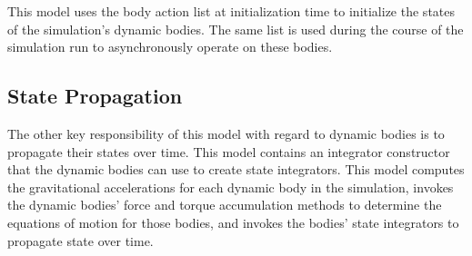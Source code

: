 This model uses the body action list
at initialization time to initialize the states of the simulation's
dynamic bodies. The same list is used during the course of the simulation
run to asynchronously operate on these bodies.

\subsection*{State Propagation}
The other key responsibility of this model with regard to dynamic bodies
is to propagate their states over time. This model contains an integrator
constructor that the dynamic bodies can use to create state integrators.
This model computes the gravitational accelerations for each dynamic
body in the simulation, invokes the dynamic bodies' force and torque accumulation methods to determine the equations of motion for those bodies,
and invokes the bodies' state integrators to propagate state over time.
